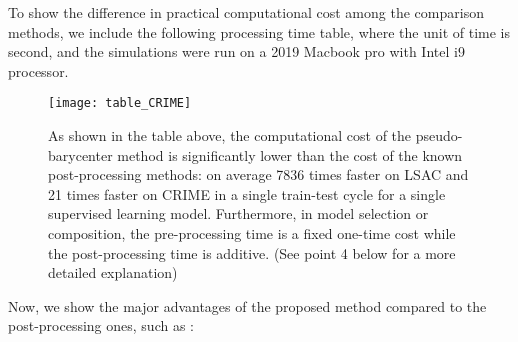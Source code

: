 \documentclass[twoside,11pt]{article}
\begin{document}
To show the difference in practical computational cost among the comparison methods, we include the following processing time table, where the unit of time is second, and the simulations were run on a 2019 Macbook pro with Intel i9 processor.

\begin{figure}[H]
\centering
\texttt{[image: table\_CRIME]}
\caption{As shown in the table above, the computational cost of the pseudo-barycenter method is significantly lower than the cost of the known post-processing methods: on average 7836 times faster on LSAC and 21 times faster on CRIME in a single train-test cycle for a single supervised learning model. Furthermore, in model selection or composition, the pre-processing time is a fixed one-time cost while the post-processing time is additive. (See point 4 below for a more detailed explanation)}
\label{time table}
\end{figure}

Now, we show the major advantages of the proposed method compared to the post-processing ones, such as \cite{chzhen2020fair, jiang2020wasserstein, gouic2020projection}:
\end{document}
